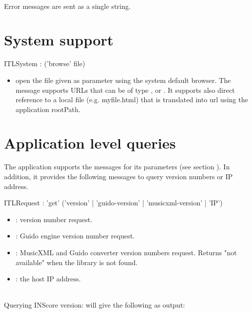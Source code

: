 \documentclass[a4paper,twoside]{report}
\newcommand{\sublevel}[1]	{\section{#1}}
\newcommand{\sampleindent}	{ \hspace{0.5cm} }
\begin{document}
\note{} \\
Error messages are sent as a single string.

\sublevel{System support}
\label{system}


\begin{rail}
ITLSystem : ('browse' file)
\end{rail}

\begin{itemize}
\item {} open the file given as parameter using the system default browser. The message supports URLs that can be of type  ,  or  . It supports also direct reference to a local file (e.g. myfile.html) that is translated into  url using the application rootPath.
\end{itemize}



\sublevel{Application level queries}
\label{ITLQuery}

The application supports the  messages for its parameters (see section ). In addition, it provides the following messages to query version numbers  or IP address.


\begin{rail}
ITLRequest : 'get'  ('version' | 'guido-version' | 'musicxml-version' | 'IP')
\end{rail}

\begin{itemize}
\item {}: version number request.
\item {}: Guido engine version number request.
\item {}: MusicXML and Guido converter version numbers request. Returns "not available" when the library is not found.
\item {}: the host IP address.

\end{itemize}

\example \\
Querying INScore version:
\sampleindent will give the following as output:
\end{document}
